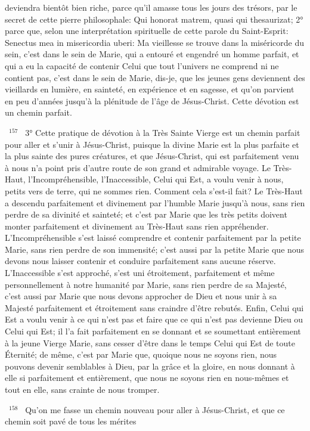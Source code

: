 \documentclass[paper=a5,pagesize=pdftex,fontsize=15pt,headinclude=on,twoside=off]{scrbook}
\newcommand{\negphantom}[1]{\settowidth{\dimen0}{#1}\hspace*{-\dimen0}}
\newcommand{\versenb}[1]{\par \vspace{10pt}~\negphantom{~${}^{#1}$~}${}^{#1}$~}
\begin{document}
deviendra bientôt bien riche, parce qu'il amasse tous les jours des trésors, par le secret de cette pierre
philosophale: Qui honorat matrem, quasi qui thesaurizat; 2° parce que, selon une interprétation spirituelle de cette
parole du Saint-Esprit: Senectus mea in misericordia uberi: Ma vieillesse se trouve dans la miséricorde du sein,
c'est dans le sein de Marie, qui a entouré et engendré un homme parfait, et qui a eu la capacité de contenir Celui
que tout l'univers ne comprend ni ne contient pas, c'est dans le sein de Marie, dis-je, que les jeunes gens
deviennent des vieillards en lumière, en sainteté, en expérience et en sagesse, et qu'on parvient en peu d'années
jusqu'à la plénitude de l'âge de Jésus-Christ.
Cette dévotion est un chemin parfait.
\versenb{157} 3° Cette pratique de dévotion à la Très Sainte Vierge est un chemin parfait pour aller et s'unir à Jésus-Christ,
puisque la divine Marie est la plus parfaite et la plus sainte des pures créatures, et que Jésus-Christ, qui est
parfaitement venu à nous n'a point pris d'autre route de son grand et admirable voyage. Le Très-Haut,
l'Incompréhensible, l'Inaccessible, Celui qui Est, a voulu venir à nous, petits vers de terre, qui ne sommes rien.
Comment cela s'est-il fait? Le Très-Haut a descendu parfaitement et divinement par l'humble Marie jusqu'à nous,
sans rien perdre de sa divinité et sainteté; et c'est par Marie que les très petits doivent monter parfaitement et
divinement au Très-Haut sans rien appréhender. L'Incompréhensible s'est laissé comprendre et contenir
parfaitement par la petite Marie, sans rien perdre de son immensité; c'est aussi par la petite Marie que nous
devons nous laisser contenir et conduire parfaitement sans aucune réserve.
L'Inaccessible s'est approché, s'est uni étroitement, parfaitement et même personnellement à notre humanité par
Marie, sans rien perdre de sa Majesté, c'est aussi par Marie que nous devons approcher de Dieu et nous unir à sa
Majesté parfaitement et étroitement sans craindre d'être rebutés.
Enfin, Celui qui Est a voulu venir à ce qui n'est pas et faire que ce qui n'est pas devienne Dieu ou Celui qui Est; il
l'a fait parfaitement en se donnant et se soumettant entièrement à la jeune Vierge Marie, sans cesser d'être dans
le temps Celui qui Est de toute Éternité; de même, c'est par Marie que, quoique nous ne soyons rien, nous
pouvons devenir semblables à Dieu, par la grâce et la gloire, en nous donnant à elle si parfaitement et
entièrement, que nous ne soyons rien en nous-mêmes et tout en elle, sans crainte de nous tromper.
\versenb{158} Qu'on me fasse un chemin nouveau pour aller à Jésus-Christ, et que ce chemin soit pavé de tous les mérites
\end{document}
